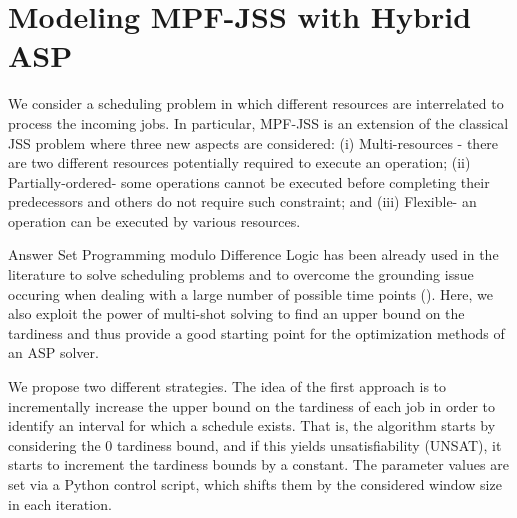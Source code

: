 \documentclass[submission,copyright,creativecommons]{eptcs}
\begin{document}
\section{Modeling MPF-JSS with Hybrid ASP}\label{sec:aspmodeling}
We consider a scheduling problem in which different resources are interrelated to process the incoming jobs. In particular, MPF-JSS is an extension of the classical JSS problem where three new aspects are considered: (i) Multi-resources - there are two different resources potentially required to execute an operation; (ii) Partially-ordered- some operations cannot be executed before completing their predecessors and others do not require such constraint; and (iii) Flexible- an operation can be executed by various resources. 

Answer Set Programming modulo Difference Logic has been already used in the literature to solve scheduling problems and to overcome the grounding issue occuring when dealing with a large number of possible time points (\cite{DBLP:conf/lpnmr/AbelsJOSTW19}). Here, we also exploit the power of multi-shot solving to find an upper bound on the tardiness and thus provide a good starting point for the optimization methods of an ASP solver. 

We propose two different strategies. The idea of the first approach is to incrementally increase the upper bound on the tardiness of each job in order to identify an interval for which a schedule exists.
%
That is, the algorithm starts by considering the $0$ tardiness bound, and if this yields unsatisfiability (UNSAT), it starts to increment the tardiness bounds by a constant. The parameter values are set via a Python control script, which shifts them by the considered window size in each iteration. 
\end{document}

